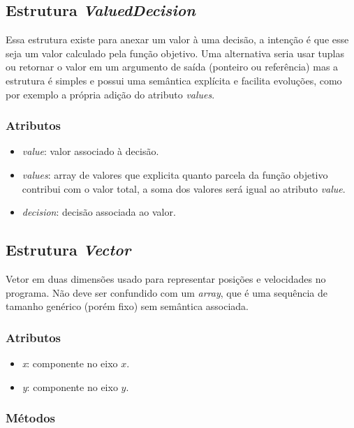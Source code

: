 \subsection*{Estrutura \textit{ValuedDecision}}

Essa estrutura existe para anexar um valor à uma decisão, a intenção é que esse
seja um valor calculado pela função objetivo.  Uma alternativa seria usar tuplas
ou retornar o valor em um argumento de saída (ponteiro ou referência) mas a
estrutura é simples e possui uma semântica explícita e facilita evoluções, como
por exemplo a própria adição do atributo \textit{values}.

\subsubsection*{Atributos}

\begin{itemize}
  \item \textit{value}: valor associado à decisão.
  \item \textit{values}: array de valores que explicita quanto parcela da função
    objetivo contribui com o valor total, a soma dos valores será igual ao
    atributo \textit{value}.
  \item \textit{decision}: decisão associada ao valor.
\end{itemize}


\subsection*{Estrutura \textit{Vector}}

Vetor em duas dimensões usado para representar posições e velocidades no
programa.  Não deve ser confundido com um \textit{array}, que é uma sequência
de tamanho genérico (porém fixo) sem semântica associada.

\subsubsection*{Atributos}

\begin{itemize}
  \item \textit{x}: componente no eixo $x$.
  \item \textit{y}: componente no eixo $y$.
\end{itemize}

\subsubsection*{Métodos}

